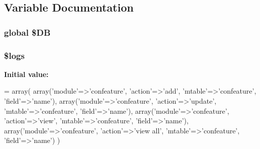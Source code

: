 \subsection{Variable Documentation}
\hypertarget{log_8php_a56f6c6070edb21a35cfa9e1df79ba61c}{
\subsubsection[{\$\-D\-B}]{\setlength{\rightskip}{0pt plus 5cm}global \$D\-B}}\label{log_8php_a56f6c6070edb21a35cfa9e1df79ba61c}
\hypertarget{log_8php_a1985bbbc5349038a012f02c97f5276e6}{
\subsubsection[{\$logs}]{\setlength{\rightskip}{0pt plus 5cm}\$logs}}\label{log_8php_a1985bbbc5349038a012f02c97f5276e6}
{\bfseries Initial value\-:}
\begin{DoxyCode}
= array(
    array(\textcolor{stringliteral}{'module'}=>\textcolor{stringliteral}{'confeature'}, \textcolor{stringliteral}{'action'}=>\textcolor{stringliteral}{'add'}, \textcolor{stringliteral}{'mtable'}=>\textcolor{stringliteral}{'confeature'}, \textcolor{stringliteral}{'field'}=>\textcolor{stringliteral}{'name'}),
    array(\textcolor{stringliteral}{'module'}=>\textcolor{stringliteral}{'confeature'}, \textcolor{stringliteral}{'action'}=>\textcolor{stringliteral}{'update'}, \textcolor{stringliteral}{'mtable'}=>\textcolor{stringliteral}{'confeature'}, \textcolor{stringliteral}{'field'}=>\textcolor{stringliteral}{'name'}),
    array(\textcolor{stringliteral}{'module'}=>\textcolor{stringliteral}{'confeature'}, \textcolor{stringliteral}{'action'}=>\textcolor{stringliteral}{'view'}, \textcolor{stringliteral}{'mtable'}=>\textcolor{stringliteral}{'confeature'}, \textcolor{stringliteral}{'field'}=>\textcolor{stringliteral}{'name'}),
    array(\textcolor{stringliteral}{'module'}=>\textcolor{stringliteral}{'confeature'}, \textcolor{stringliteral}{'action'}=>\textcolor{stringliteral}{'view all'}, \textcolor{stringliteral}{'mtable'}=>\textcolor{stringliteral}{'confeature'}, \textcolor{stringliteral}{'field'}=>\textcolor{stringliteral}{'name'})
)
\end{DoxyCode}
